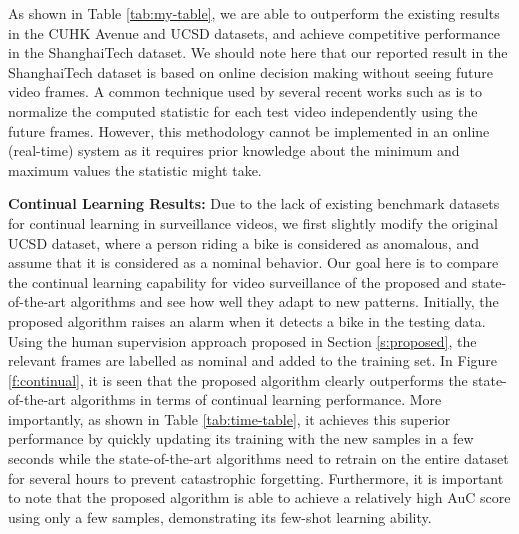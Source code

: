 As shown in Table \ref{tab:my-table}, we are able to outperform the existing results in the CUHK Avenue and UCSD datasets, and achieve competitive performance in the ShanghaiTech dataset. We should note here that our reported result in the ShanghaiTech dataset is based on online decision making without seeing future video frames.
A common technique used by several recent works such as \cite{liu2018future,ionescu2019object} is to normalize the computed statistic for each test video independently using the future frames. However, this methodology cannot be implemented in an online (real-time) system as it requires prior knowledge about the minimum and maximum values the statistic might take. 

\textbf{Continual Learning Results:}
Due to the lack of existing benchmark datasets for continual learning in surveillance videos, we first slightly modify the original UCSD dataset, where a person riding a bike is considered as anomalous, and assume that it is considered as a nominal behavior. Our goal here is to compare the continual learning capability for video surveillance of the proposed and state-of-the-art algorithms and see how well they adapt to new patterns. Initially, the proposed algorithm raises an alarm when it detects a bike in the testing data. Using the human supervision approach proposed in Section \ref{s:proposed}, the relevant frames are labelled as nominal and added to the training set. In Figure \ref{f:continual}, it is seen that the proposed algorithm clearly outperforms the state-of-the-art algorithms \cite{ionescu2019object,liu2018future} in terms of continual learning performance. More importantly, as shown in Table \ref{tab:time-table}, it achieves this superior performance by quickly updating its training with the new samples in a few seconds while the state-of-the-art algorithms need to retrain on the entire dataset for several hours to prevent catastrophic forgetting. Furthermore, it is important to note that the proposed algorithm is able to achieve a relatively high AuC score using only a few samples, demonstrating its few-shot learning ability. 


\begin{table}[h]
\tiny{
\centering
{}
\vspace{2mm}
\caption{Time required to update the model for each batch of new samples.}
\label{tab:time-table}
}
\end{table}

